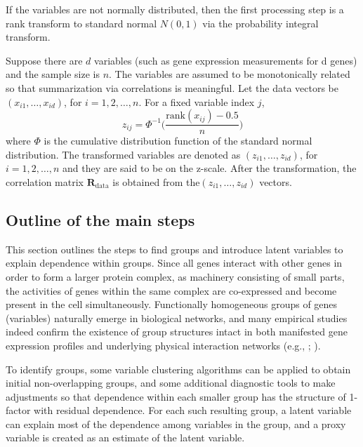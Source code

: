 \documentclass[a4paper]{article}
\def\bfr{{\bm{R}}}
\begin{document}
If the variables are not normally distributed, then the first processing step is a rank transform
to standard normal $N(0, 1)$ via the probability integral transform.

Suppose there are $d$ variables (such as gene expression measurements for d genes) and the
sample size is $n$. The variables are assumed to be monotonically related so that summarization
via correlations is meaningful. Let the data vectors be $(x_{i1},\ldots,x_{id})$, for $i=1,2,\ldots,n$. For a fixed variable index $j$,
\begin{equation*}
    z_{ij}=\Phi^{-1}\bigg(\frac{\text{rank}(x_{ij})-0.5}{n}\bigg)
\end{equation*}
where $\Phi$ is the cumulative distribution function of the standard normal distribution. The transformed variables are denoted as $(z_{i1},\ldots,z_{id})$, for $i=1,2,\ldots,n$ and they are said to be on the z-scale. After the transformation, the correlation matrix $\bfr_{\text{data}}$ is obtained from the$(z_{i1},\ldots,z_{id})$ vectors. 

\subsection{Outline of the main steps}
\label{sec-outline}

This section outlines the steps to find groups and introduce latent
variables to explain dependence within groups. Since all genes
interact with other genes in order to form a larger protein complex,
as machinery consisting of small parts, the activities of genes within
the same complex are co-expressed and become present in the cell
simultaneously. Functionally homogeneous groups of genes (variables)
naturally emerge in biological networks, and many empirical studies
indeed confirm the existence of group structures intact in both
manifested gene expression profiles and underlying physical
interaction networks (e.g., \cite{barabasi2004network};
\cite{jansen2002relating}).

To identify groups, some variable clustering algorithms can be applied
to obtain initial non-overlapping groups, and some additional
diagnostic tools to make adjustments so that dependence within each
smaller group has the structure of 1-factor with residual dependence.
For each such resulting group, a latent variable can explain most of
the dependence among variables in the group, and a proxy variable is
created as an estimate of the latent variable.
\end{document}
